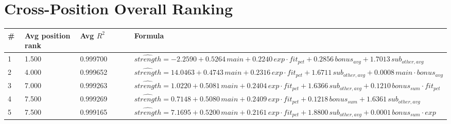 \documentclass[a4paper,11pt]{article}
\begin{document}
\section*{Cross-Position Overall Ranking}
\begin{longtable}{p{0.05\linewidth}p{0.20\linewidth}p{0.20\linewidth}p{0.55\linewidth}}
\toprule
\# & Avg position rank & Avg $R^2$ & Formula \\
\midrule
\endhead
1 & 1.500 & 0.999700 & $\hat{strength} = -2.2590 + 0.5264\,main + 0.2240\,exp\cdot fit_{pct} + 0.2856\,bonus_{avg} + 1.7013\,sub_{other,avg}$ \\
2 & 4.000 & 0.999652 & $\hat{strength} = 14.0463 + 0.4743\,main + 0.2316\,exp\cdot fit_{pct} + 1.6711\,sub_{other,avg} + 0.0008\,main\cdot bonus_{avg}$ \\
3 & 7.000 & 0.999263 & $\hat{strength} = 1.0220 + 0.5081\,main + 0.2404\,exp\cdot fit_{pct} + 1.6366\,sub_{other,avg} + 0.1210\,bonus_{sum}\cdot fit_{pct}$ \\
4 & 7.500 & 0.999269 & $\hat{strength} = 0.7148 + 0.5080\,main + 0.2409\,exp\cdot fit_{pct} + 0.1218\,bonus_{sum} + 1.6361\,sub_{other,avg}$ \\
5 & 7.500 & 0.999165 & $\hat{strength} = 7.1695 + 0.5200\,main + 0.2161\,exp\cdot fit_{pct} + 1.8800\,sub_{other,avg} + 0.0001\,bonus_{sum}\cdot exp$ \\
\bottomrule
\end{longtable}
\end{document}
